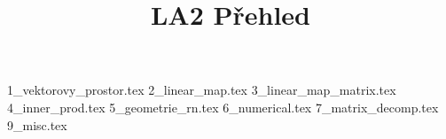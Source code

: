 \documentclass[a4paper]{article}
\begin{document}
\title{LA2 Přehled}

\maketitle
\pagebreak

{1_vektorovy_prostor.tex}
{2_linear_map.tex}
{3_linear_map_matrix.tex}
{4_inner_prod.tex}
{5_geometrie_rn.tex}
{6_numerical.tex}
{7_matrix_decomp.tex}
{9_misc.tex}
\end{document}

